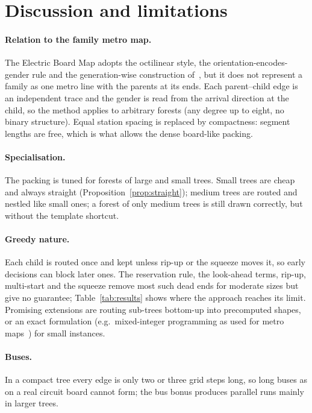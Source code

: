 \documentclass[11pt,a4paper]{article}
\theoremstyle{remark}
\begin{document}
\section{Discussion and limitations}\label{sec:discussion}

\paragraph{Relation to the family metro map.} The Electric Board Map adopts the octilinear style, the
orientation-encodes-gender rule and the generation-wise construction of~\cite{korst2020}, but it does not represent a
family as one metro line with the parents at its ends. Each parent--child edge is an independent trace and the gender
is read from the arrival direction at the child, so the method applies to arbitrary forests (any degree up to eight,
no binary structure). Equal station spacing is replaced by compactness: segment lengths are free, which is what
allows the dense board-like packing.

\paragraph{Specialisation.} The packing is tuned for forests of large and small trees. Small trees are cheap and
always straight (Proposition~\ref{prop:straight}); medium trees are routed and nestled like small ones; a forest of
only medium trees is still drawn correctly, but without the template shortcut.

\paragraph{Greedy nature.} Each child is routed once and kept unless rip-up or the squeeze moves it, so early
decisions can block later ones. The reservation rule, the look-ahead terms, rip-up, multi-start and the squeeze remove
most such dead ends for moderate sizes but give no guarantee; Table~\ref{tab:results} shows where the approach reaches
its limit. Promising extensions are routing sub-trees bottom-up into precomputed shapes, or an exact formulation
(e.g.\ mixed-integer programming as used for metro maps~\cite{nollenberg2011,bast2020}) for small instances.

\paragraph{Buses.} In a compact tree every edge is only two or three grid steps long, so long buses as on a real
circuit board cannot form; the bus bonus produces parallel runs mainly in larger trees.
\end{document}
